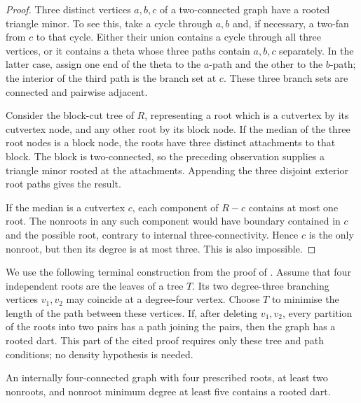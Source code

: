 \begin{proof}
Three distinct vertices $a,b,c$ of a two-connected graph have a rooted
triangle minor. To see this, take a cycle through $a,b$ and, if necessary,
a two-fan from $c$ to that cycle. Either their union contains a cycle
through all three vertices, or it contains a theta whose three paths
contain $a,b,c$ separately. In the latter case, assign one end of the
theta to the $a$-path and the other to the $b$-path; the interior of the
third path is the branch set at $c$. These three branch sets are
connected and pairwise adjacent.

Consider the block-cut tree of $R$, representing a root which is a
cutvertex by its cutvertex node, and any other root by its block node.
If the median of the three root nodes is a block node, the roots have
three distinct attachments to that block. The block is two-connected,
so the preceding observation supplies a triangle minor rooted at the
attachments. Appending the three disjoint exterior root paths gives
the result.

If the median is a cutvertex $c$, each component of $R-c$ contains at
most one root. The nonroots in any such component would have boundary
contained in $c$ and the possible root, contrary to internal
three-connectivity. Hence $c$ is the only nonroot, but then its degree
is at most three. This is also impossible.
\end{proof}

We use the following terminal construction from the proof of
\cite[Lemma~3.1]{DNR2026}. Assume that four independent roots are the
leaves of a tree $T$. Its two degree-three branching vertices $v_1,v_2$
may coincide at a degree-four vertex. Choose $T$ to minimise the length
of the path between these vertices. If, after deleting $v_1,v_2$, every
partition of the roots into two pairs has a path joining the pairs,
then the graph has a rooted dart. This part of the cited proof requires
only these tree and path conditions; no density hypothesis is needed.

\begin{lemma}\label{lem:dart}
An internally four-connected graph with four prescribed roots, at least
two nonroots, and nonroot minimum degree at least five contains a rooted
dart.
\end{lemma}

